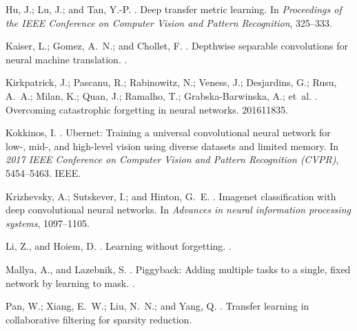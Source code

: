 \documentclass[letterpaper]{article} \usepackage{aaai19}  \usepackage{times}  \usepackage{helvet}  \usepackage{courier}  \usepackage{url}  \usepackage{graphicx}  \usepackage{amssymb}
\begin{document}
\begin{thebibliography}{}
Hu, J.; Lu, J.; and Tan, Y.-P.
.
\newblock Deep transfer metric learning.
\newblock In {\em Proceedings of the IEEE Conference on Computer Vision and
  Pattern Recognition},  325--333.

Kaiser, L.; Gomez, A.~N.; and Chollet, F.
.
\newblock Depthwise separable convolutions for neural machine translation.
.

Kirkpatrick, J.; Pascanu, R.; Rabinowitz, N.; Veness, J.; Desjardins, G.; Rusu,
  A.~A.; Milan, K.; Quan, J.; Ramalho, T.; Grabska-Barwinska, A.; et~al.
.
\newblock Overcoming catastrophic forgetting in neural networks.
  201611835.

Kokkinos, I.
.
\newblock Ubernet: Training a universal convolutional neural network for low-,
  mid-, and high-level vision using diverse datasets and limited memory.
\newblock In {\em 2017 IEEE Conference on Computer Vision and Pattern
  Recognition (CVPR)},  5454--5463.
\newblock IEEE.

Krizhevsky, A.; Sutskever, I.; and Hinton, G.~E.
.
\newblock Imagenet classification with deep convolutional neural networks.
\newblock In {\em Advances in neural information processing systems},
  1097--1105.

Li, Z., and Hoiem, D.
.
\newblock Learning without forgetting.
.

Mallya, A., and Lazebnik, S.
.
\newblock Piggyback: Adding multiple tasks to a single, fixed network by
  learning to mask.
.

Pan, W.; Xiang, E.~W.; Liu, N.~N.; and Yang, Q.
.
\newblock Transfer learning in collaborative filtering for sparsity reduction.


\end{thebibliography}
\end{document}
